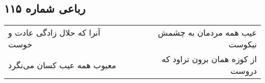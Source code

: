 \begin{center}
\section*{رباعی شماره ۱۱۵}
\label{sec:sh115}
\begin{longtable}{l p{0.5cm} r}
آنرا که حلال زادگی عادت و خوست
&&
عیب همه مردمان به چشمش نیکوست
\\
معیوب همه عیب کسان می‌نگرد
&&
از کوزه همان برون تراود که دروست
\\
\end{longtable}
\end{center}
